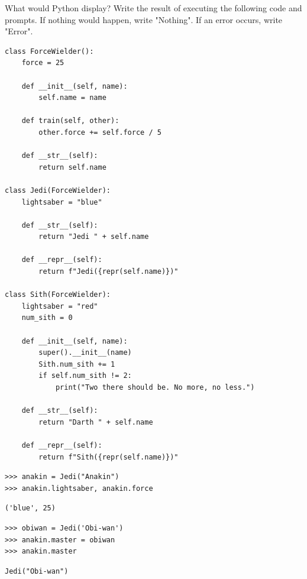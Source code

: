 \begin{blocksection}
\question What would Python display? Write the result of executing the following code and prompts. If nothing would happen, write "Nothing". If an error occurs, write "Error".

\begin{lstlisting}
class ForceWielder():
    force = 25

    def __init__(self, name):
        self.name = name

    def train(self, other):
        other.force += self.force / 5

    def __str__(self):
        return self.name

class Jedi(ForceWielder):
    lightsaber = "blue"

    def __str__(self):
        return "Jedi " + self.name

    def __repr__(self):
        return f"Jedi({repr(self.name)})"

class Sith(ForceWielder):
    lightsaber = "red"
    num_sith = 0

    def __init__(self, name):
        super().__init__(name)
        Sith.num_sith += 1
        if self.num_sith != 2:
            print("Two there should be. No more, no less.")
        
    def __str__(self):
        return "Darth " + self.name

    def __repr__(self):
        return f"Sith({repr(self.name)})"
\end{lstlisting}
\end{blocksection}

\newpage
\begin{lstlisting}
>>> anakin = Jedi("Anakin")
>>> anakin.lightsaber, anakin.force
\end{lstlisting}
\begin{solution}[.2in]
\begin{lstlisting}
('blue', 25)
\end{lstlisting}
\end{solution}

\begin{lstlisting}
>>> obiwan = Jedi('Obi-wan')
>>> anakin.master = obiwan
>>> anakin.master
\end{lstlisting}
\begin{solution}[.2in]
\begin{lstlisting}
Jedi("Obi-wan")
\end{lstlisting}
\end{solution}

